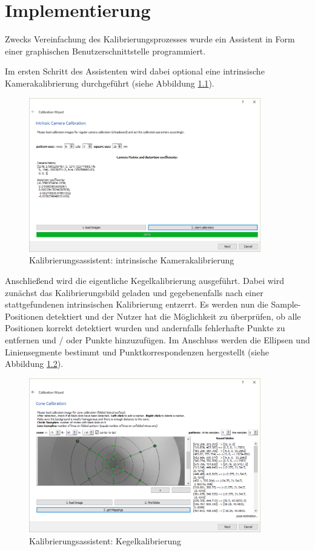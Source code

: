 \chapter{Implementierung}
\label{ch:implementation}

Zwecks Vereinfachung des Kalibrierungsprozesses wurde ein Assistent in Form einer graphischen Benutzerschnittstelle programmiert. 

Im ersten Schritt des Assistenten wird dabei optional eine intrinsische Kamerakalibrierung durchgeführt (siehe Abbildung \ref{fig:wizard1}). 
\begin{figure}[!htb]
	\centering
	\includegraphics[width=0.9\textwidth]{images/GUI/calibWizard1_1.PNG}
	\caption{Kalibrierungsassistent: intrinsische Kamerakalibrierung}
	\label{fig:wizard1}
\end{figure}

Anschließend wird die eigentliche Kegelkalibrierung ausgeführt. Dabei wird zunächst das Kalibrierungsbild geladen und gegebenenfalls nach einer stattgefundenen intrinsischen Kalibrierung entzerrt. Es werden nun die Sample-Positionen detektiert und der Nutzer hat die Möglichkeit zu überprüfen, ob alle Positionen korrekt detektiert wurden und andernfalls fehlerhafte Punkte zu entfernen und / oder Punkte hinzuzufügen. Im Anschluss werden die Ellipsen und Liniensegmente bestimmt und Punktkorrespondenzen hergestellt (siehe Abbildung \ref{fig:wizard2}).

\begin{figure}[!htb]
	\centering
	\includegraphics[width=0.9\textwidth]{images/GUI/calibWizard2_1.PNG}
	\caption{Kalibrierungsassistent: Kegelkalibrierung}
	\label{fig:wizard2}
\end{figure}

